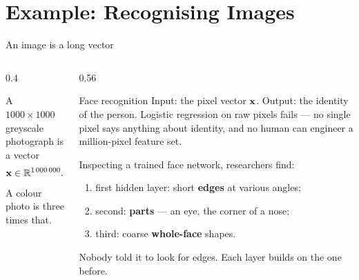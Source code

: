 \documentclass[aspectratio=169,10pt]{beamer}
\begin{document}
\section{Example: Recognising Images}

\begin{frame}{An image is a long vector}
  \begin{columns}[T,onlytextwidth]
    \begin{column}{0.4\textwidth}
      \centering
      \vspace{1mm}

      \footnotesize
      A $1000\times1000$ greyscale photograph is a vector
      \[ \mathbf{x}\in\mathbb{R}^{1\,000\,000}. \]
      A colour photo is three times that.
    \end{column}
    \begin{column}{0.56\textwidth}
      \begin{block}{Face recognition}
        \footnotesize
        Input: the pixel vector $\mathbf{x}$. Output: the identity of the person. Logistic
        regression on raw pixels fails --- no single pixel says anything about identity, and
        no human can engineer a million-pixel feature set.
      \end{block}
      \begin{keyidea}
        \footnotesize
        Inspecting a trained face network, researchers find:
        \begin{enumerate}
          \item first hidden layer: short \textbf{edges} at various angles;
          \item second: \textbf{parts} --- an eye, the corner of a nose;
          \item third: coarse \textbf{whole-face} shapes.
        \end{enumerate}
        Nobody told it to look for edges. Each layer builds on the one before.
      \end{keyidea}
    \end{column}
  \end{columns}
\end{frame}
\end{document}
